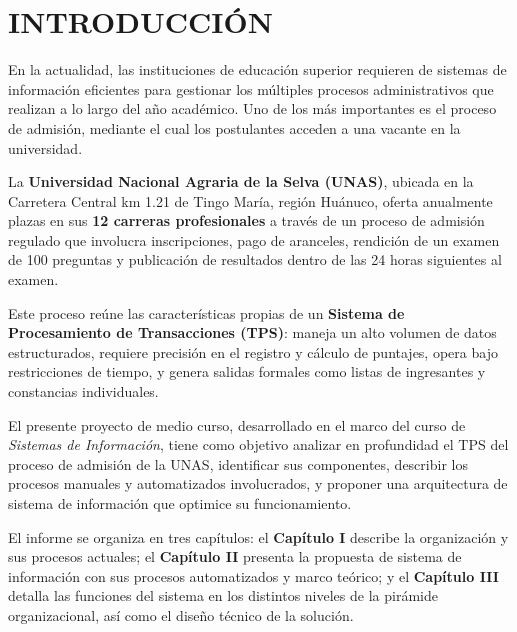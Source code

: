 \documentclass[12pt, a4paper]{report}
\begin{document}
\chapter*{INTRODUCCIÓN}

En la actualidad, las instituciones de educación superior requieren de sistemas de información eficientes para gestionar los múltiples procesos administrativos que realizan a lo largo del año académico. Uno de los más importantes es el proceso de admisión, mediante el cual los postulantes acceden a una vacante en la universidad.

La \textbf{Universidad Nacional Agraria de la Selva (UNAS)}, ubicada en la Carretera Central km 1.21 de Tingo María, región Huánuco, oferta anualmente plazas en sus \textbf{12 carreras profesionales} a través de un proceso de admisión regulado que involucra inscripciones, pago de aranceles, rendición de un examen de 100 preguntas y publicación de resultados dentro de las 24 horas siguientes al examen.

Este proceso reúne las características propias de un \textbf{Sistema de Procesamiento de Transacciones (TPS)}: maneja un alto volumen de datos estructurados, requiere precisión en el registro y cálculo de puntajes, opera bajo restricciones de tiempo, y genera salidas formales como listas de ingresantes y constancias individuales.

El presente proyecto de medio curso, desarrollado en el marco del curso de \textit{Sistemas de Información}, tiene como objetivo analizar en profundidad el TPS del proceso de admisión de la UNAS, identificar sus componentes, describir los procesos manuales y automatizados involucrados, y proponer una arquitectura de sistema de información que optimice su funcionamiento.

El informe se organiza en tres capítulos: el \textbf{Capítulo I} describe la organización y sus procesos actuales; el \textbf{Capítulo II} presenta la propuesta de sistema de información con sus procesos automatizados y marco teórico; y el \textbf{Capítulo III} detalla las funciones del sistema en los distintos niveles de la pirámide organizacional, así como el diseño técnico de la solución.

\newpage

\setcounter{page}{1}
\end{document}
